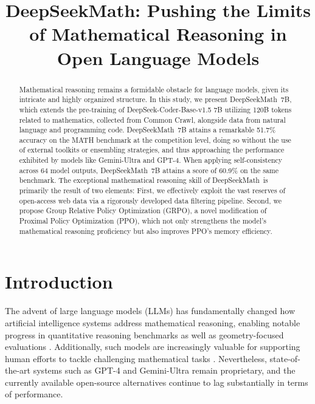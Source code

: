 \title{DeepSeekMath: Pushing the Limits of Mathematical Reasoning in Open Language Models}

\begin{abstract}
Mathematical reasoning remains a formidable obstacle for language models, given its intricate and highly organized structure. In this study, we present DeepSeekMath~7B, which extends the pre-training of DeepSeek-Coder-Base-v1.5 7B utilizing 120B tokens related to mathematics, collected from Common Crawl, alongside data from natural language and programming code. DeepSeekMath~7B attains a remarkable 51.7\% accuracy on the MATH benchmark at the competition level, doing so without the use of external toolkits or ensembling strategies, and thus approaching the performance exhibited by models like Gemini-Ultra and GPT-4. When applying self-consistency across 64 model outputs, DeepSeekMath~7B attains a score of 60.9\% on the same benchmark. The exceptional mathematical reasoning skill of DeepSeekMath~is primarily the result of two elements: First, we effectively exploit the vast reserves of open-access web data via a rigorously developed data filtering pipeline. Second, we propose Group Relative Policy Optimization (GRPO), a novel modification of Proximal Policy Optimization (PPO), which not only strengthens the model’s mathematical reasoning proficiency but also improves PPO's memory efficiency.
\end{abstract}

\section{Introduction}

The advent of large language models (LLMs) has fundamentally changed how artificial intelligence systems address mathematical reasoning, enabling notable progress in quantitative reasoning benchmarks \citep{MATH} as well as geometry-focused evaluations \citep{trinh2024solving}. Additionally, such models are increasingly valuable for supporting human efforts to tackle challenging mathematical tasks \citep{tao}. Nevertheless, state-of-the-art systems such as GPT-4 \citep{gpt4} and Gemini-Ultra \citep{gemini} remain proprietary, and the currently available open-source alternatives continue to lag substantially in terms of performance.

